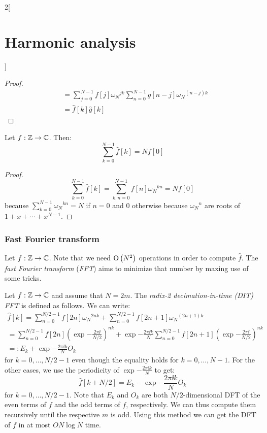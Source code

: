 \documentclass[../../../main_math.tex]{subfiles}
\begin{document}
\begin{multicols}{2}[\section{Harmonic analysis}]
\begin{proof}
\begin{align*}
                       & =\sum_{j=0}^{N-1}f[j]{\omega_N}^{jk}\sum_{n=0}^{N-1}g[n-j]{\omega_N}^{(n-j)k} \\
                       & =\widehat{f}[k]\widehat{g}[k]
    \end{align*}
  \end{proof}
  \begin{theorem}
    Let $f:\mathbb{Z}\rightarrow\mathbb{C}$. Then:
    $$\sum_{k=0}^{N-1}\widehat{f}[k]=Nf[0]$$
  \end{theorem}
  \begin{proof}
    $$\sum_{k=0}^{N-1}\widehat{f}[k]=\sum_{k,n=0}^{N-1}f[n]{\omega_N}^{kn}=Nf[0]$$
    because $\sum_{k=0}^{N-1}{\omega_N}^{kn}=N$ if $n=0$ and 0 otherwise because ${\omega_N}^{n}$ are roots of $1+x+\cdots+x^{N-1}$.
  \end{proof}
  \subsubsection{Fast Fourier transform}
  \begin{definition}
    Let $f:\mathbb{Z}\rightarrow\mathbb{C}$. Note that we need $\mathrm{O}\left(N^2\right)$ operations in order to compute $\widehat{f}$. The \emph{fast Fourier transform} (\emph{FFT}) aims to minimize that number by maxing use of some tricks.
  \end{definition}
  \begin{definition}
    Let $f:\mathbb{Z}\rightarrow\mathbb{C}$ and assume that $N=2m$. The \emph{radix-2 decimation-in-time (DIT) FFT} is defined as follows. We can write:
    \begin{multline*}
      \widehat{f}[k] =\sum_{n=0}^{N/2-1}f[2n]{\omega_N}^{2nk}+\sum_{n=0}^{N/2-1}f[2n+1]{\omega_N}^{(2n+1)k}    \\ =\sum_{n=0}^{N/2-1}f[2n]{(\exp{-\frac{2\pi\ii}{N/2}})}^{nk}+\exp{-\frac{2\pi\ii k}{N}}\sum_{n=0}^{N/2-1}f[2n+1]{(\exp{-\frac{2\pi\ii}{N/2}})}^{nk} \\
      =:E_k+\exp{-\frac{2\pi\ii k}{N}}O_k
    \end{multline*}
    for $k=0,\ldots,N/2-1$ even though the equality holds for $k=0,\ldots,N-1$. For the other cases, we use the periodicity of $\exp{-\frac{2\pi\ii k}{N}}$ to get:
    $$\widehat{f}[k+N/2] =E_k-\exp{-\frac{2\pi\ii k}{N}}O_k$$
    for $k=0,\ldots,N/2-1$.
    Note that $E_k$ and $O_k$ are both $N/2$-dimensional DFT of the even terms of $f$ and the odd terms of $f$, respectively. We can thus compute them recursively until the respective $m$ is odd. Using this method we can get the DFT of $f$ in at most $O{N\log N}$ time.
  \end{definition}

\end{multicols}
\end{document}

